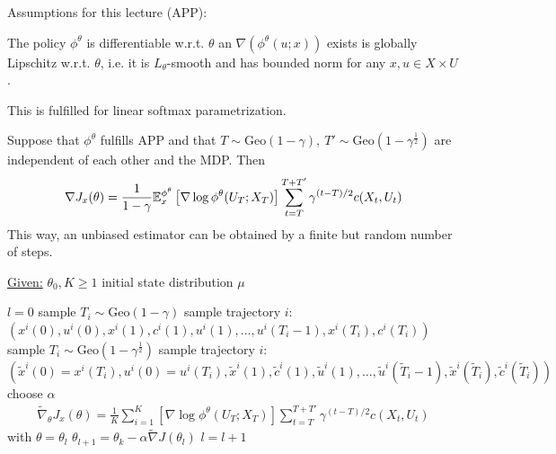 Assumptions for this lecture (APP): 

The policy \(\phi^\theta\) is differentiable w.r.t. \(\theta\) an \(\nabla(\phi^\theta(u;x))\) exists 
is globally Lipschitz w.r.t. \(\theta\), i.e. it is \(L_\theta\)-smooth and has bounded 
norm for any \(x,u\in X\times U\). 

This is fulfilled for linear softmax parametrization.

\begin{proposition}\label{prop:58}
    Suppose that \(\phi^\theta\) fulfills APP and that 
    \(T\sim\text{Geo}(1-\gamma),\ T'\sim\text{Geo}(1-\gamma^{\frac{1}{2}})\) are independent
    of each other and the MDP. Then 
    \[\nabla J_x(\theta)=\frac{1}{1-\gamma}\mathbb{E}_x^{\phi^\theta}\left[\nabla\log \phi^\theta(U_T;X_T)\right]\sum_{t=T}^{T+T'}\gamma^{(t-T)/2}c(X_t,U_t)\]
    This way, an unbiased estimator can be obtained by a finite but random number of steps. 
\end{proposition}

\begin{algorithm}[H]
    \caption{Minibatch-REINFORCE for finite Time Horizon}\label{alg:reinforce_ft}
    \underline{Given:} \(\theta_0,K\geq 1\) initial state distribution \(\mu\)
    \begin{algorithmic}
    \State \(l=0\)
            \State sample \(T_i\sim \text{Geo}(1-\gamma)\)
            \State sample trajectory \(i\): \((x^i(0),u^i(0),x^i(1),c^i(1),u^i(1),\dots, u^i(T_i-1),x^i(T_i),c^i(T_i))\) 
            \State sample \(T_i\sim \text{Geo}(1-\gamma^{\frac{1}{2}})\)
            \State sample trajectory \(i\): \((\tilde{x}^i(0)=x^i(T_i),u^i(0)=u^i(T_i),\tilde x^i(1),\tilde c^i(1),\tilde u^i(1),\dots,\tilde u^i(\tilde T_i-1),\tilde x^i(\tilde T_i),\tilde c^i(\tilde T_i))\)
        \EndFor
        \State choose \(\alpha\)
        \State \begin{align*}
            \tilde{\nabla}_\theta J_x(\theta)=\frac{1}{K}\sum_{i=1}^K\left[\nabla\log \phi^\theta(U_T;X_T)\right]\sum_{t=T}^{T+T'}\gamma^{(t-T)/2}c(X_t,U_t)
        \end{align*} with \(\theta=\theta_l\)
        \State \(\theta_{l+1}=\theta_k-\alpha \tilde{\nabla}J(\theta_l)\)
        \State \(l=l+1\) 
    \EndWhile
\end{algorithmic}
\end{algorithm}

